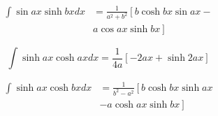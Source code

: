 \documentclass[../main.tex]{subfiles}
\begin{document}
    \begin{align*}
    \int \sin ax \sinh bx dx &= 
    \frac{1}{a^2 + b^2} \left[
    b \cosh bx \sin ax -
    \right . \nonumber \\ & \left .
     a \cos ax \sinh bx
    \right] 
    \end{align*}
    
    \begin{equation*}
    \int \sinh ax \cosh ax dx= 
    \frac{1}{4a}\left[ 
    -2ax + \sinh 2ax \right]
    \end{equation*}
    
    \begin{align*}
    \int \sinh ax \cosh bx dx&= 
    \frac{1}{b^2-a^2}\left[ 
    b \cosh bx \sinh ax 
    \right . \nonumber \\ & \left .
    - a \cosh ax \sinh bx \right]
    \end{align*}
\end{document}
